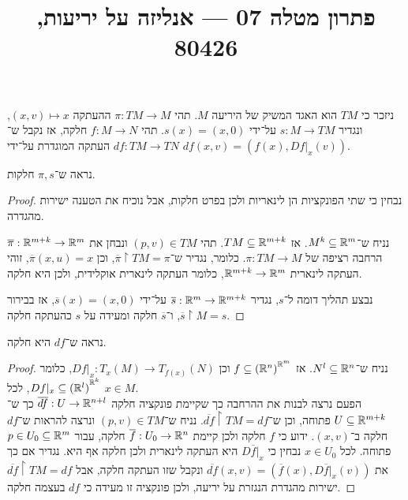 
\title{פתרון מטלה 07 --- אנליזה על יריעות, 80426}

\DeclareMathOperator{\vol}{vol}


\maketitle
\maketitleprint[blue]

\question{}
ניזכר כי $TM$ הוא האגד המשיק של היריעה $M$.
תהי $\pi : TM \to M$ ההעתקה $(x, v) \mapsto x$, ונגדיר $s : M \to TM$ על־ידי $s(x) = (x, 0)$.
תהי $f : M \to N$ חלקה, אז נקבל ש־$df : TM \to TN$ העתקה המוגדרת על־ידי $df(x, v) = (f(x), Df |_x(v))$.

\subquestion{}
נראה ש־$\pi, s$ חלקות.
\begin{proof}
	נבחין כי שתי הפונקציות הן לינאריות ולכן בפרט חלקות, אבל נוכיח את הטענה ישירות מהגדרה.

	נניח ש־$M^k \subseteq \mathbb{R}^m$.
	אז $TM \subseteq \mathbb{R}^{m + k}$.
	תהי $(p, v) \in TM$ ונבחן את $\overline{\pi} : \mathbb{R}^{m + k} \to \mathbb{R}^m$ הרחבה רציפה של $\pi : TM \to M$.
	כלומר, נגדיר ש־$\overline{\pi} \restriction TM = \pi$, וכן $\overline{\pi}(x, u) = x$, זוהי העתקה לינארית $\mathbb{R}^{m + k} \to \mathbb{R}^m$, כלומר העתקה לינארית אוקלידית, ולכן היא חלקה.

	נבצע תהליך דומה ל־$s$, נגדיר $\overline{s} : \mathbb{R}^m \to \mathbb{R}^{m + k}$ על־ידי $\overline{s}(x) = (x, 0)$, אז בבירור $\overline{s} \restriction M = s$, ו־$\overline{s}$ חלקה ומעידה על $s$ כהעתקה חלקה.
\end{proof}

\subquestion{}
נראה ש־$df$ היא חלקה.
\begin{proof}
	נניח ש־$N^l \subseteq \mathbb{R}^n$. אז $f \subseteq {(\mathbb{R}^n)}^{\mathbb{R}^m}$ וכן $D f |_x : T_x(M) \to T_{f(x)}(N)$, כלומר $Df |_x \subseteq {(\mathbb{R}^l)}^{\mathbb{R}^k}$, לכל $x \in M$. \\
	הפעם נרצה לבנות את ההרחבה כך שקיימת פונקציה חלקה $\overline{df} : U \to \mathbb{R}^{n + l}$ כך ש־$U \subseteq \mathbb{R}^{m + k}$ פתוחה, וכן ש־$\overline{df} \restriction TM = df$.
	נניח ש־$(p, v) \in TM$ ונרצה להראות ש־$df$ חלקה ב־$(x, v)$.
	ידוע כי $f$ חלקה ולכן קיימת $\overline{f} : U_0 \to \mathbb{R}^n$ חלקה, עבור $p \in U_0 \subseteq \mathbb{R}^m$ פתוחה.
	לכל $x \in U_0$ נבחין כי $D \overline{f} |_x$ היא העתקה לינארית ולכן חלקה אף היא.
	נגדיר אם כך את $\overline{df}(x, v) = (\overline{f}(x), D \overline{f}|_x(v))$ ונקבל שזו העתקה חלקה, אבל $\overline{df} \restriction TM = df$ ישירות מהגדרת הנגזרת על יריעה, ולכן פונקציה זו מעידה כי $df$ בעצמה חלקה.
\end{proof}

